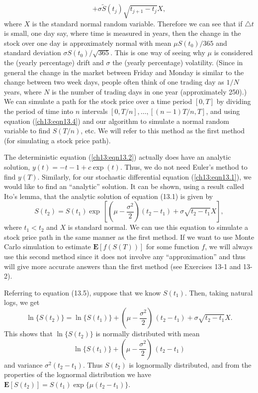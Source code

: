 \documentclass{stml-l}
\theoremstyle{definition}
\numberwithin{equation}{chapter}
\numberwithin{figure}{chapter}
\numberwithin{figure}{section}
\begin{document}
\begin{equation}
\label{ch13:eqn13.4}+\sigma\tilde{S}(t_{j})\sqrt{t_{j+1}-t_{j}}X,
\end{equation}
where $X$ is the standard normal random variable. Therefore we can
see that if $\triangle t$ is small, one day say, where time is
measured in years, then the change in the stock over one day is
approximately normal with mean $\mu S(t_{0})/365$ and standard
deviation $\sigma S(t_{0})/\sqrt{365}$. This is one way of seeing
why $\mu$ is considered the (yearly percentage) drift and $\sigma$
the (yearly percentage) volatility. (Since in general the change in
the market between Friday and Monday is similar to the change between
two week days, people often think of one trading day as $1/N$ years,
where $N$ is the number of trading days in one year (approximately
250).) We can simulate a path for the stock price over a time
period $[0,T]$ by dividing the period of time into $n$ intervals
$[0,T/n],\ldots,[(n-1)T/n,T]$, and using equation (\ref{ch13:eqn13.4}) and our
algorithm to simulate a normal random variable to find $S(T/n)$,
etc. We will refer to this method as the first method (for
simulating a stock price path).

The deterministic equation (\ref{ch13:eqn13.2})
actually does have an analytic solution, $y(t)=-t-1+c\exp(t)$.
Thus, we do not need Euler's method to find $y(T)$. Similarly, for
our stochastic differential equation (\ref{ch13:eqn13.1}), we would like to find
an ``analytic'' solution. It can be shown, using a result called
Ito's lemma, that the analytic solution of equation (13.1) is given
by
\begin{equation}
\label{ch13:eqn13.5}S(t_{2})=S(t_{1})\exp\,[(\mu-\frac{\sigma^{2}}{2})(t_{2}-t_{1})+\sigma\sqrt{t_{2}-t_{1}}X],
\end{equation}
where $t_{1}<t_{2}$ and $X$ is standard normal. We can use this equation to simulate a stock price path in the same manner as the first method. If we want to use Monte Carlo simulation to estimate $\mathbf{E}[f(S(T))]$ for some function $f$, we will always use this second method since it does not involve any ``approximation'' and thus will give more accurate answers than the first method (see Exercises 13-1 and 13-2).

Referring to equation (13.5), suppose that we know $S(t_{1})$. Then, taking natural logs, we get
\begin{equation}
\label{ch13:eqn13.6}\ln\{S(t_{2})\}=\ln\{S(t_{1})\}+(\mu-\frac{\sigma^{2}}{2})\,(t_{2}-t_{1})+\sigma\sqrt{t_{2}-t_{1}}X.
\end{equation}
This shows that $\ln\{S(t_{2})\}$ is normally distributed with mean
\begin{equation*}
\ln\{S(t_{1})\}+(\mu-\frac{\sigma^{2}}{2})\,(t_{2}-t_{1})
\end{equation*}
and variance $\sigma^{2}(t_{2}-t_{1})$. Thus $S(t_{2})$ is lognormally distributed, and from the properties of the lognormal distribution we have $\mathbf{E}[S(t_{2})]= S(t_{1})\exp\{\mu(t_{2}-t_{1})\}$.
\end{document}
